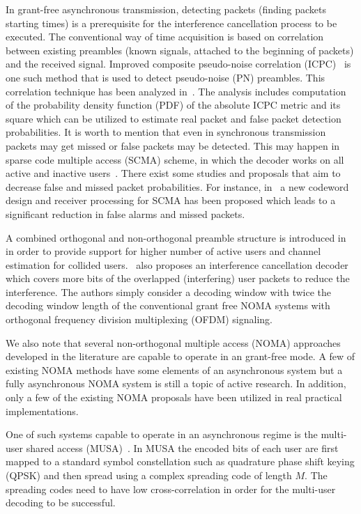 \documentclass[journal,onecolumn,12pt]{IEEEtran}
\begin{document}
In grant-free asynchronous transmission, detecting packets (finding packets starting times) is a prerequisite for the interference cancellation process to be executed. The conventional way of time acquisition is based on correlation between existing preambles (known signals, attached to the beginning of packets) and the received signal. Improved composite pseudo-noise correlation (ICPC)~\cite{GLHLZ13} is one such method that is used to detect pseudo-noise (PN) preambles. This correlation technique has been analyzed in~\cite{PKHH15}. The analysis includes computation of the probability density function (PDF) of the absolute ICPC metric and its square which can be utilized to estimate real packet and false packet detection probabilities. It is worth to mention that even in synchronous transmission packets may get missed or false packets may be detected. This may happen in sparse code multiple access (SCMA) scheme, in which the decoder works on all active and inactive users~\cite{zte16}. There exist some studies and proposals that aim to decrease false and missed packet probabilities. For instance, in~\cite{KLKWNH17} a new codeword design and receiver processing for SCMA has been proposed which leads to a significant reduction in false alarms and missed packets. 

A combined orthogonal and non-orthogonal preamble structure is introduced in~\cite{KKH21} in order to provide support for higher number of active users and channel estimation for collided users.~\cite{KKH21} also proposes an interference cancellation decoder which covers more bits of the overlapped (interfering) user packets to reduce the interference. The authors simply  consider a decoding window with twice the decoding window length of the conventional grant free NOMA systems with orthogonal frequency division multiplexing (OFDM) signaling.

We also note that several non-orthogonal multiple access (NOMA) approaches developed in the literature are capable to operate in an grant-free mode. A few of existing NOMA methods have some elements of an asynchronous system but a fully asynchronous NOMA system is still a topic of active research. In addition, only a few of the existing NOMA proposals have been utilized in real practical implementations.

One of such systems capable to operate in an asynchronous regime is the multi-user shared access (MUSA)~\cite{MUSA16,YYYL17}. In MUSA the encoded bits of each user are first mapped to a standard symbol constellation such as quadrature phase shift keying (QPSK) and then spread using a complex spreading code of length $M$. The spreading codes need to have low cross-correlation in order for the multi-user decoding to be successful. 
\end{document}
